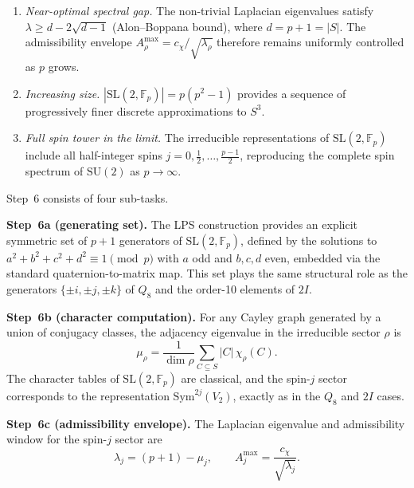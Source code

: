     \begin{enumerate}
      \item \emph{Near-optimal spectral gap.}
      The non-trivial Laplacian eigenvalues satisfy
      $\lambda \ge d - 2\sqrt{d-1}$ (Alon--Boppana bound),
      where $d = p + 1 = |S|$.
      The admissibility envelope
      $A^{\max}_\rho = c_\chi/\sqrt{\lambda_\rho}$ therefore remains
      uniformly controlled as $p$ grows.

      \item \emph{Increasing size.}
      $|\mathrm{SL}(2,\mathbb{F}_p)| = p(p^2-1)$ provides a sequence of
      progressively finer discrete approximations to $S^3$.

      \item \emph{Full spin tower in the limit.}
      The irreducible representations of $\mathrm{SL}(2,\mathbb{F}_p)$
      include all half-integer spins
      $j = 0, \tfrac12, \ldots, \tfrac{p-1}{2}$,
      reproducing the complete spin spectrum of $\mathrm{SU}(2)$ as
      $p \to \infty$.
    \end{enumerate}

    Step~6 consists of four sub-tasks.

    \medskip
    \noindent\textbf{Step~6a (generating set).}
    The LPS construction provides an explicit symmetric set of $p+1$
    generators of $\mathrm{SL}(2,\mathbb{F}_p)$, defined by the solutions to
    $a^2+b^2+c^2+d^2 \equiv 1 \pmod p$ with $a$ odd and $b,c,d$ even,
    embedded via the standard quaternion-to-matrix map.
    This set plays the same structural role as the generators
    $\{\pm i,\pm j,\pm k\}$ of $Q_8$ and the order-10 elements of $2I$.

    \medskip
    \noindent\textbf{Step~6b (character computation).}
    For any Cayley graph generated by a union of conjugacy classes,
    the adjacency eigenvalue in the irreducible sector $\rho$ is
    \begin{equation}
      \mu_\rho
      =
      \frac{1}{\dim\rho}
      \sum_{C \subseteq S} |C|\,\chi_\rho(C).
      \label{eq:mu-SL2}
    \end{equation}
    The character tables of $\mathrm{SL}(2,\mathbb{F}_p)$ are classical,
    and the spin-$j$ sector corresponds to the representation
    $\mathrm{Sym}^{2j}(V_2)$, exactly as in the $Q_8$ and $2I$ cases.

    \medskip
    \noindent\textbf{Step~6c (admissibility envelope).}
    The Laplacian eigenvalue and admissibility window for the spin-$j$
    sector are
    \begin{equation}
      \lambda_j = (p+1) - \mu_j,
      \qquad
      A^{\max}_j = \frac{c_\chi}{\sqrt{\lambda_j}}.
      \label{eq:Amax-SL2}
    \end{equation}

